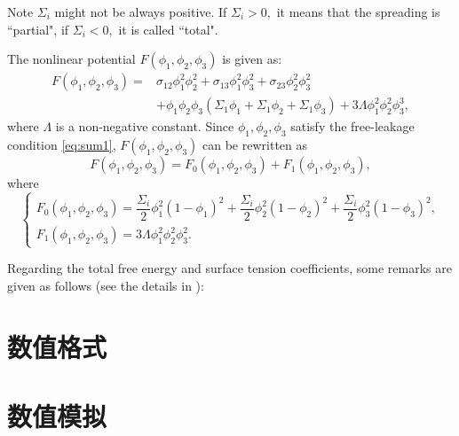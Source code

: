 Note $\varSigma_i$ might not be always positive. If $\varSigma_i>0,$ it means that the spreading is ``partial", if $\varSigma_i<0,$ it is called ``total".

The nonlinear potential $F(\phi_1,\phi_2,\phi_3)$ is given as: 
\begin{equation}
	\begin{aligned}
		F(\phi_1,\phi_2,\phi_3) = & \sigma_{12}\phi_1^2\phi_2^2+\sigma_{13}\phi_1^2\phi_3^2 +\sigma_{23}\phi_2^2\phi_3^2 \\
		&+ \phi_1\phi_2\phi_3(\varSigma_1\phi_1 +\varSigma_1\phi_2+\varSigma_1\phi_3) +3\Lambda\phi_1^2\phi_2^2\phi_3^3,
	\end{aligned}
\end{equation}
where $\Lambda$ is a non-negative constant. Since $\phi_1,\phi_2,\phi_3$ satisfy the free-leakage condition \eqref{eq:sum1}, $F(\phi_1,\phi_2,\phi_3)$ can be rewritten as
\begin{equation}
F(\phi_1,\phi_2,\phi_3)=F_0(\phi_1,\phi_2,\phi_3)+F_1(\phi_1,\phi_2,\phi_3),
\end{equation}
where
\begin{equation}
\begin{cases}
F_0(\phi_1,\phi_2,\phi_3)  =\dfrac{\varSigma_i}{2}\phi_1^2(1-\phi_1)^2 +\dfrac{\varSigma_i}{2}\phi_2^2(1-\phi_2)^2 +\dfrac{\varSigma_i}{2}\phi_3^2(1-\phi_3)^2,   \\
F_1(\phi_1,\phi_2,\phi_3) = 3\Lambda\phi_1^2\phi_2^2\phi_3^2.
\end{cases}
\end{equation}


Regarding the total free energy and surface tension coefficients, some remarks are given as follows (see the details in \cite{Boyer2006M2AN}):


\section{数值格式}
\label{sec:schemes}



\section{数值模拟}
\label{sec:simulation}



